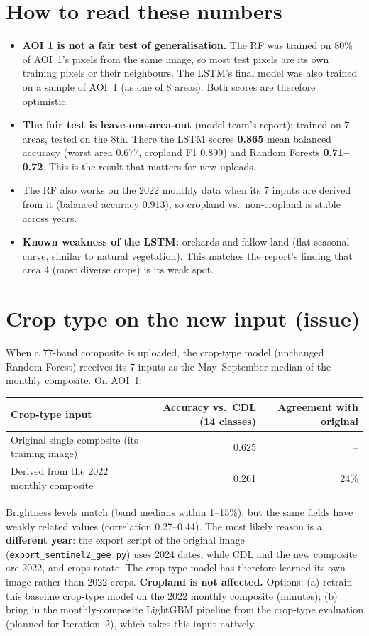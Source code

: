 \documentclass[11pt,a4paper]{article}
\begin{document}
\section{How to read these numbers}
\begin{itemize}
  \item \textbf{AOI 1 is not a fair test of generalisation.} The RF was trained on 80\% of AOI~1's pixels from the same
        image, so most test pixels are its own training pixels or their neighbours. The LSTM's final model was also
        trained on a sample of AOI~1 (as one of 8 areas). Both scores are therefore optimistic.
  \item \textbf{The fair test is leave-one-area-out} (model team's report): trained on 7 areas, tested on the 8th.
        There the LSTM scores \textbf{0.865} mean balanced accuracy (worst area 0.677, cropland F1 0.899) and Random
        Forests \textbf{0.71--0.72}. This is the result that matters for new uploads.
  \item The RF also works on the 2022 monthly data when its 7 inputs are derived from it (balanced accuracy 0.913),
        so cropland vs.\ non-cropland is stable across years.
  \item \textbf{Known weakness of the LSTM:} orchards and fallow land (flat seasonal curve, similar to natural vegetation).
        This matches the report's finding that area 4 (most diverse crops) is its weak spot.
\end{itemize}

\section{Crop type on the new input (issue)}
When a 77-band composite is uploaded, the crop-type model (unchanged Random Forest) receives its 7 inputs as the
May--September median of the monthly composite. On AOI~1:
\begin{center}\small
\begin{tabular}{lrr}
\toprule
Crop-type input & Accuracy vs.\ CDL (14 classes) & Agreement with original\\
\midrule
Original single composite (its training image) & 0.625 & --\\
Derived from the 2022 monthly composite & \textcolor{bad}{0.261} & 24\%\\
\bottomrule
\end{tabular}
\end{center}
Brightness levels match (band medians within 1--15\%), but the same fields have weakly related values
(correlation 0.27--0.44). The most likely reason is a \textbf{different year}: the export script of the original
image (\texttt{export\_sentinel2\_gee.py}) uses 2024 dates, while CDL and the new composite are 2022, and crops rotate.
The crop-type model has therefore learned its own image rather than 2022 crops. \textbf{Cropland is not affected.}
Options: (a) retrain this baseline crop-type model on the 2022 monthly composite (minutes); (b) bring in the
monthly-composite LightGBM pipeline from the crop-type evaluation (planned for Iteration~2), which takes this
input natively.
\end{document}
